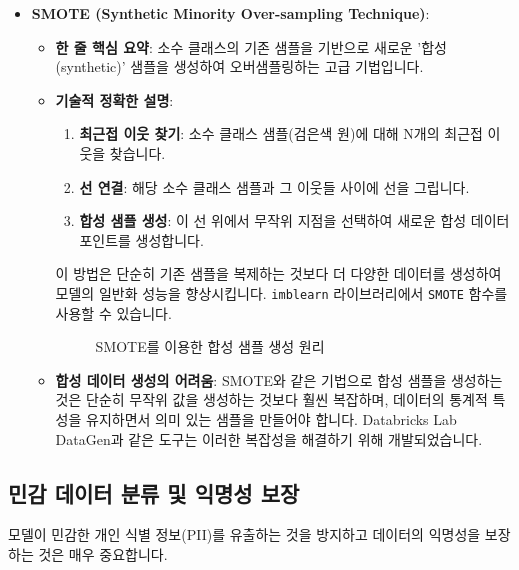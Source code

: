 \documentclass[11pt,a4paper]{article}
\theoremstyle{definition}
\begin{document}
\begin{itemize}
\begin{itemize}
\begin{itemize}
\begin{itemize}
\begin{itemize}
        \end{itemize}
        \item \textbf{SMOTE (Synthetic Minority Over-sampling Technique)}:
        \begin{itemize}
            \item \textbf{한 줄 핵심 요약}: 소수 클래스의 기존 샘플을 기반으로 새로운 '합성(synthetic)' 샘플을 생성하여 오버샘플링하는 고급 기법입니다.
            \item \textbf{기술적 정확한 설명}:
            \begin{enumerate}
                \item \textbf{최근접 이웃 찾기}: 소수 클래스 샘플(검은색 원)에 대해 N개의 최근접 이웃을 찾습니다.
                \item \textbf{선 연결}: 해당 소수 클래스 샘플과 그 이웃들 사이에 선을 그립니다.
                \item \textbf{합성 샘플 생성}: 이 선 위에서 무작위 지점을 선택하여 새로운 합성 데이터 포인트를 생성합니다.
            \end{enumerate}
            이 방법은 단순히 기존 샘플을 복제하는 것보다 더 다양한 데이터를 생성하여 모델의 일반화 성능을 향상시킵니다. \texttt{imblearn} 라이브러리에서 \texttt{SMOTE} 함수를 사용할 수 있습니다.
            \begin{figure}[h!]
                \centering
                \caption{SMOTE를 이용한 합성 샘플 생성 원리}
                \label{fig:smote}
            \end{figure}
            \item \textbf{합성 데이터 생성의 어려움}: SMOTE와 같은 기법으로 합성 샘플을 생성하는 것은 단순히 무작위 값을 생성하는 것보다 훨씬 복잡하며, 데이터의 통계적 특성을 유지하면서 의미 있는 샘플을 만들어야 합니다. Databricks Lab DataGen과 같은 도구는 이러한 복잡성을 해결하기 위해 개발되었습니다.
        \end{itemize}
    \end{itemize}

\newpage
\subsection*{민감 데이터 분류 및 익명성 보장}

모델이 민감한 개인 식별 정보(PII)를 유출하는 것을 방지하고 데이터의 익명성을 보장하는 것은 매우 중요합니다.


\end{itemize}
\end{itemize}
\end{itemize}
\end{document}
